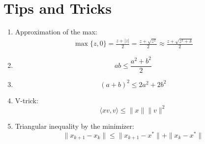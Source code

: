 \documentclass[12pt, openany]{report}
\theoremstyle{definition}
\begin{document}
\chapter{Tips and Tricks}\label{chap:tricks}
\begin{enumerate}
	\item Approximation of the max:
	\begin{equation}\label{eq:approx_max}
		\begin{aligned}
			\max\{z,0\} = \frac{z+|z|}{2} = \frac{z + \sqrt{z^2}}{2} \approx \frac{z + \sqrt{z^2 + \delta}}{2}
		\end{aligned}	
	\end{equation}
	\item \begin{equation}\label{eq:sq1}
		ab \leq \frac{a^2+b^2}{2}	
	\end{equation}
	\item \begin{equation}\label{eq:sq2}
		(a+b)^2 \leq 2a^2+2b^2
	\end{equation}
	\item V-trick:
	\begin{equation}\label{eq:vtrick}
		\langle xv,v\rangle \leq \|x\|\|v\|^2
	\end{equation}
	\item Triangular inequality by the minimizer: 
	\begin{equation}\label{eq:triangular_inequality_by_min}
		\|x_{k+1}-x_k\| \leq \|x_{k+1}-x^*\|+\|x_k-x^*\|
	\end{equation}
\end{enumerate}
\end{document}
